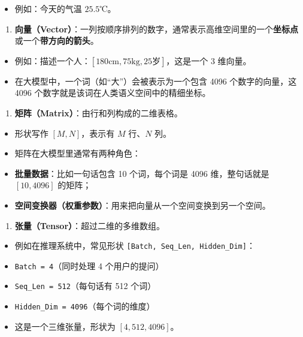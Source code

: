 \begin{itemize}
  \item 例如：今天的气温 $25.5$℃。
\end{itemize}

\begin{enumerate}
  \item \textbf{向量（Vector）}：一列按顺序排列的数字，通常表示高维空间里的一个\textbf{坐标点}或一个\textbf{带方向的箭头}。
\end{enumerate}

\begin{itemize}
  \item 例如：描述一个人：$[180\text{cm}, 75\text{kg}, 25\text{岁}]$，这是一个 3 维向量。
  \item 在大模型中，一个词（如“大”）会被表示为一个包含 4096 个数字的向量，这 4096 个数字就是该词在人类语义空间中的精细坐标。
\end{itemize}

\begin{enumerate}
  \item \textbf{矩阵（Matrix）}：由行和列构成的二维表格。
\end{enumerate}

\begin{itemize}
  \item 形状写作 $[M, N]$，表示有 $M$ 行、$N$ 列。
  \item 矩阵在大模型里通常有两种角色：
  \item \textbf{批量数据}：比如一句话包含 10 个词，每个词是 4096 维，整句话就是 $[10, 4096]$ 的矩阵；
  \item \textbf{空间变换器（权重参数）}：用来把向量从一个空间变换到另一个空间。
\end{itemize}

\begin{enumerate}
  \item \textbf{张量（Tensor）}：超过二维的多维数组。
\end{enumerate}

\begin{itemize}
  \item 例如在推理系统中，常见形状 \texttt{[Batch, Seq\_Len, Hidden\_Dim]}：
  \item \texttt{Batch = 4}（同时处理 4 个用户的提问）
  \item \texttt{Seq\_Len = 512}（每句话有 512 个词）
  \item \texttt{Hidden\_Dim = 4096}（每个词的维度）
  \item 这是一个三维张量，形状为 $[4, 512, 4096]$。
\end{itemize}

